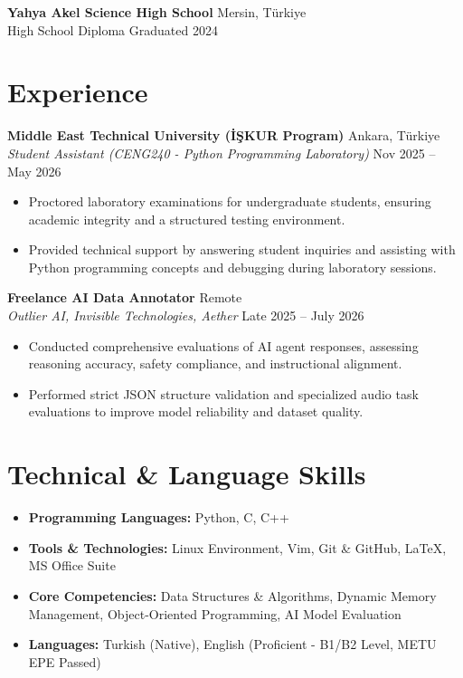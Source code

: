 \documentclass[11pt,a4paper]{article}
\begin{document}
\vspace{4pt}
\textbf{Yahya Akel Science High School} \hfill Mersin, Türkiye \\
High School Diploma \hfill Graduated 2024

\section*{Experience}
\textbf{Middle East Technical University (İŞKUR Program)} \hfill Ankara, Türkiye \\
\textit{Student Assistant (CENG240 - Python Programming Laboratory)} \hfill Nov 2025 -- May 2026
\begin{itemize}
    \item Proctored laboratory examinations for undergraduate students, ensuring academic integrity and a structured testing environment.
    \item Provided technical support by answering student inquiries and assisting with Python programming concepts and debugging during laboratory sessions.
\end{itemize}

\vspace{4pt}
\textbf{Freelance AI Data Annotator} \hfill Remote \\
\textit{Outlier AI, Invisible Technologies, Aether} \hfill Late 2025 -- July 2026
\begin{itemize}
    \item Conducted comprehensive evaluations of AI agent responses, assessing reasoning accuracy, safety compliance, and instructional alignment.
    \item Performed strict JSON structure validation and specialized audio task evaluations to improve model reliability and dataset quality.
\end{itemize}

\section*{Technical \& Language Skills}
\begin{itemize}
    \item \textbf{Programming Languages:} Python, C, C++
    \item \textbf{Tools \& Technologies:} Linux Environment, Vim, Git \& GitHub, LaTeX, MS Office Suite
    \item \textbf{Core Competencies:} Data Structures \& Algorithms, Dynamic Memory Management, Object-Oriented Programming, AI Model Evaluation
    \item \textbf{Languages:} Turkish (Native), English (Proficient - B1/B2 Level, METU EPE Passed)
\end{itemize}
\end{document}
